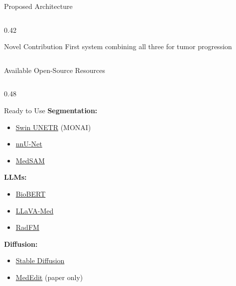\documentclass[aspectratio=169,xcolor=dvipsnames]{beamer}
\begin{document}
\begin{frame}{Proposed Architecture}
\begin{columns}
\begin{column}{0.42\textwidth}
            \begin{alertblock}{Novel Contribution}
                \small First system combining all three for tumor progression
            \end{alertblock}
        \end{column}
    \end{columns}
\end{frame}

\begin{frame}{Available Open-Source Resources}
    \begin{columns}
        \begin{column}{0.48\textwidth}
            \begin{block}{\textcolor{green}{} Ready to Use}
                \small
                \textbf{Segmentation:}
                \begin{itemize}\setlength{\itemsep}{0pt}
                    \item \href{https://github.com/Project-MONAI/MONAI}{Swin UNETR} (MONAI)
                    \item \href{https://github.com/MIC-DKFZ/nnUNet}{nnU-Net}
                    \item \href{https://github.com/bowang-lab/MedSAM}{MedSAM}
                \end{itemize}
                
                \textbf{LLMs:}
                \begin{itemize}\setlength{\itemsep}{0pt}
                    \item \href{https://huggingface.co/dmis-lab/biobert-v1.1}{BioBERT}
                    \item \href{https://github.com/microsoft/LLaVA-Med}{LLaVA-Med}
                    \item \href{https://github.com/chaoyi-wu/RadFM}{RadFM}
                \end{itemize}
                
                \textbf{Diffusion:}
                \begin{itemize}\setlength{\itemsep}{0pt}
                    \item \href{https://github.com/CompVis/stable-diffusion}{Stable Diffusion}
                    \item \href{https://arxiv.org/abs/2407.15270}{MedEdit} (paper only)
                \end{itemize}
            \end{block}
        \end{column}
        

\end{columns}
\end{frame}
\end{document}
